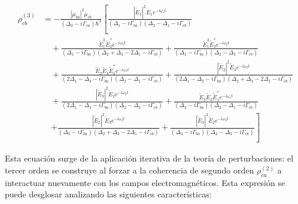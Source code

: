 \documentclass[12pt,a4paper]{article}
\begin{document}
\begin{equation}
\begin{aligned}
\rho_{cb}^{(3)} &= -\frac{|\mu_{ba}|^2 \mu_{cb}}{(\Delta_2 - i\Gamma_{ca})\hbar^3} \left[ \frac{|\tilde{E}_1|^2 \tilde{E}_1 e^{-i\omega_1 t}}{(\Delta_1 - i\Gamma_{ba})(\Delta_2 - \Delta_1 - i\Gamma_{cb})} \right. \\
&\quad + \frac{\tilde{E}_1^2 \tilde{E}_2^* e^{-i\omega_3 t}}{(\Delta_1 - i\Gamma_{ba})(\Delta_2 + \Delta_3 - 2\Delta_1 - i\Gamma_{cb})} + \frac{\tilde{E}_1^2 \tilde{E}_3^* e^{-i\omega_2 t}}{(\Delta_1 - i\Gamma_{ba})(\Delta_2 - \Delta_3 - i\Gamma_{cb})} \\
&\quad + \frac{\tilde{E}_2 \tilde{E}_3 \tilde{E}_1^* e^{-i\omega_1 t}}{(2\Delta_1 - \Delta_3 - i\Gamma_{ba})(\Delta_2 - \Delta_1 - i\Gamma_{cb})} + \frac{|\tilde{E}_2|^2 \tilde{E}_3 e^{-i\omega_3 t}}{(2\Delta_1 - \Delta_3 - i\Gamma_{ba})(\Delta_2 + \Delta_3 - 2\Delta_1 - i\Gamma_{cb})} \\
&\quad + \frac{|\tilde{E}_3|^2 \tilde{E}_2 e^{-i\omega_2 t}}{(2\Delta_1 - \Delta_3 - i\Gamma_{ba})(\Delta_2 - \Delta_3 - i\Gamma_{cb})} + \frac{\tilde{E}_3 \tilde{E}_2 \tilde{E}_1^* e^{-i\omega_1 t}}{(\Delta_3 - i\Gamma_{ba})(\Delta_2 - \Delta_1 - i\Gamma_{cb})} \\
&\quad \left. + \frac{|\tilde{E}_2|^2 \tilde{E}_3 e^{-i\omega_3 t}}{(\Delta_3 - i\Gamma_{ba})(\Delta_2 + \Delta_3 - 2\Delta_1 - i\Gamma_{cb})} + \frac{|\tilde{E}_3|^2 \tilde{E}_2 e^{-i\omega_2 t}}{(\Delta_3 - i\Gamma_{ba})(\Delta_2 - \Delta_3 - i\Gamma_{cb})} \right]
\end{aligned} \tag{4a}
\end{equation}

 Esta ecuación surge de la aplicación iterativa de la teoría de perturbaciones: el tercer orden se construye al forzar a la coherencia de segundo orden $\rho_{ca}^{(2)}$ a interactuar nuevamente con los campos electromagnéticos. Esta expresión se puede desglosar analizando las siguientes características:
\end{document}
